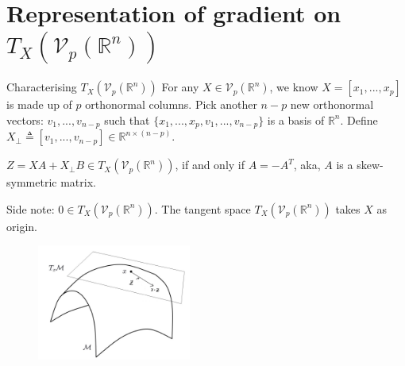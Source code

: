 \documentclass[aspectratio=43, 10pt]{beamer}
\begin{document}
\section{Representation of gradient on $T_X(\mathcal{V}_p(\mathbb{R}^n))$}
  \begin{frame}[t]{Characterising $T_X(\mathcal{V}_p(\mathbb{R}^n))$}
    \vspace{-0.8em}
    For any $X \in \mathcal{V}_p(\mathbb{R}^n)$, we know $X=[x_1, ..., x_p]$ is made up of $p$ orthonormal columns. Pick another $n-p$ new orthonormal vectors: $v_{1},...,v_{n-p}$ such that $\{x_1,...,x_p, v_1,...,v_{n-p}\}$ is a basis of $\mathbb{R}^n$. Define $X_\perp \triangleq [v_1,...,v_{n-p}] \in \mathbb{R}^{n \times (n-p)}$. 
    \begin{lemma}
        $Z = XA + X_{\perp} B \in T_X (\mathcal{V}_p(\mathbb{R}^n))$, if and only if $A = -A^T$, aka, $A$ is a skew-symmetric matrix.  
    \end{lemma}

    Side note: $0 \in T_X (\mathcal{V}_p(\mathbb{R}^n))$. The tangent space $T_X (\mathcal{V}_p(\mathbb{R}^n))$ takes $X$ as  origin. 

    \vspace{-0.3em}
        \begin{figure}
            \centering
                \includegraphics[width=0.45\textwidth]{figures/xorigin.pdf}
        \end{figure}
  \end{frame}
\end{document}
